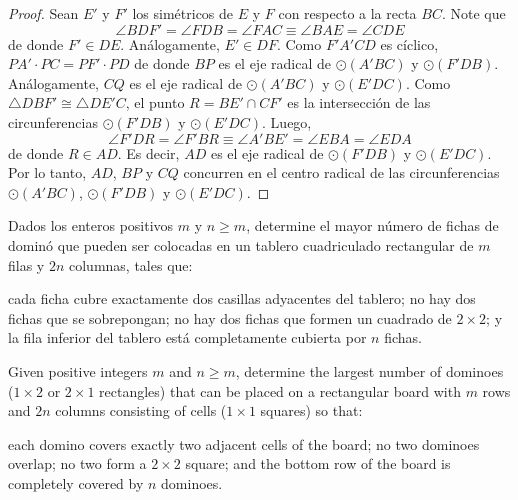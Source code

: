 \begin{proof}
  Sean $E'$ y $F'$ los simétricos de $E$ y $F$ con respecto a la recta $BC$.
  Note que
  \[\angle BDF'=\angle FDB=\angle FAC\equiv\angle BAE=\angle CDE\]
  de donde $F'\in DE$. Análogamente, $E'\in DF$. Como $F'A'CD$ es cíclico,
  $PA'\cdot PC=PF'\cdot PD$ de donde $BP$ es el eje radical de $\odot(A'BC)$ y
  $\odot(F'DB)$. Análogamente, $CQ$ es el eje radical de $\odot(A'BC)$ y
  $\odot(E'DC)$. Como $\triangle DBF'\cong\triangle DE'C$, el punto
  $R=BE'\cap CF'$ es la intersección de las circunferencias $\odot(F'DB)$ y
  $\odot(E'DC)$. Luego,
  \[\angle F'DR=\angle F'BR\equiv\angle A'BE'=\angle EBA=\angle EDA\]
  de donde $R\in AD$. Es decir, $AD$ es el eje radical de $\odot(F'DB)$ y
  $\odot(E'DC)$. Por lo tanto, $AD$, $BP$ y $CQ$ concurren en el centro radical
  de las circunferencias $\odot(A'BC)$, $\odot(F'DB)$ y $\odot(E'DC)$.
\end{proof}

\begin{probHR}[RMM 2016/2]
  Dados los enteros positivos $m$ y $n\ge m$, determine el mayor número de
  fichas de dominó que pueden ser colocadas en un tablero cuadriculado
  rectangular de $m$ filas y $2n$ columnas, tales que:
  \begin{enumerate}[(i)]
    \ii cada ficha cubre exactamente dos casillas adyacentes del tablero;
    \ii no hay dos fichas que se sobrepongan;
    \ii no hay dos fichas que formen un cuadrado de $2\times 2$; y
    \ii la fila inferior del tablero está completamente cubierta por $n$ fichas.
  \end{enumerate}
  \begin{hint}
    Given positive integers $m$ and $n\ge m$, determine the largest number of
    dominoes ($1\times 2$ or $2\times 1$ rectangles) that can be placed on a
    rectangular board with $m$ rows and $2n$ columns consisting of cells
    ($1\times 1$ squares) so that:
    \begin{enumerate}[(i)]
      \ii each domino covers exactly two adjacent cells of the board;
      \ii no two dominoes overlap;
      \ii no two form a $2\times 2$ square; and
      \ii the bottom row of the board is completely covered by $n$ dominoes.
    \end{enumerate}
  \end{hint}
\end{probHR}

